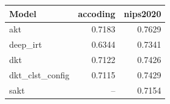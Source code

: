 \begin{tabular}{lrr}
\toprule
Model & accoding & nips2020 \\
\midrule
akt & 0.7183 & 0.7629 \\
deep\_irt & 0.6344 & 0.7341 \\
dkt & 0.7122 & 0.7426 \\
dkt\_clst\_config & 0.7115 & 0.7429 \\
sakt & -- & 0.7154 \\
\bottomrule
\end{tabular}
